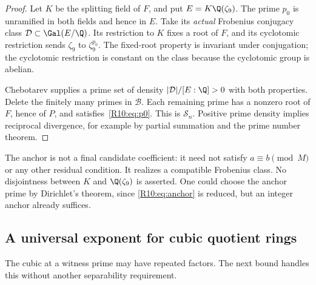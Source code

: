 \documentclass[11pt,a4paper]{article}
\theoremstyle{definition}\newtheorem{definition}[theorem]{Definition}
\theoremstyle{remark}\newtheorem{remark}[theorem]{Remark}
\begin{document}
\begin{proof}
Let $K$ be the splitting field of $F$, and put $E=K\Q(\zeta_9)$.
The prime $p_0$ is unramified in both fields and hence in $E$.
Take its \emph{actual} Frobenius conjugacy class
$\mathcal D\subset\Gal(E/\Q)$.
Its restriction to $K$ fixes a root of $F$, and its cyclotomic
restriction sends $\zeta_9$ to $\zeta_9^{p_0}$.
The fixed-root property is invariant under conjugation; the cyclotomic
restriction is constant on the class because the cyclotomic group is abelian.

Chebotarev supplies a prime set of density $|\mathcal D|/[E:\Q]>0$
with both properties. Delete the finitely many primes in $\mathcal B$.
Each remaining prime has a nonzero root of $F$, hence of $P$, and
satisfies~\eqref{R10:eq:p0}. This is $\mathcal S_n$.
Positive prime density implies reciprocal divergence, for example by
partial summation and the prime number theorem.
\end{proof}

The anchor is not a final candidate coefficient: it need not satisfy
$a\equiv b\pmod M$ or any other residual condition.
It realizes a compatible Frobenius class.
No disjointness between $K$ and $\Q(\zeta_9)$ is asserted.
One could choose the anchor prime by Dirichlet's theorem, since
\eqref{R10:eq:anchor} is reduced, but an integer anchor already suffices.

\subsection{A universal exponent for cubic quotient rings}
\label{R10:sec:orders}

The cubic at a witness prime may have repeated factors.
The next bound handles this without another separability requirement.
\end{document}

